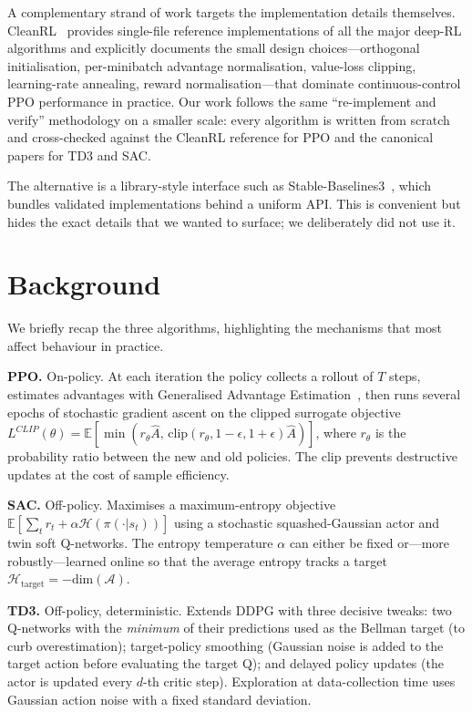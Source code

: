 \documentclass[letterpaper]{article}
\begin{document}
A complementary strand of work targets the implementation details
themselves. CleanRL~\citep{huang2022cleanrl} provides single-file
reference implementations of all the major deep-RL algorithms and
explicitly documents the small design choices---orthogonal
initialisation, per-minibatch advantage normalisation, value-loss
clipping, learning-rate annealing, reward normalisation---that dominate
continuous-control PPO performance in practice. Our work follows the
same ``re-implement and verify'' methodology on a smaller scale:
every algorithm is written from scratch and cross-checked against the
CleanRL reference for PPO and the canonical papers for TD3 and SAC.

The alternative is a library-style interface such as
Stable-Baselines3~\citep{raffin2021sb3}, which bundles validated
implementations behind a uniform API. This is convenient but hides the
exact details that we wanted to surface; we deliberately did not use it.

\section{Background}

We briefly recap the three algorithms, highlighting the mechanisms that
most affect behaviour in practice.

\noindent\textbf{PPO.}
On-policy. At each iteration the policy collects a rollout of $T$ steps,
estimates advantages with Generalised Advantage
Estimation~\citep{schulman2017ppo}, then runs several epochs of stochastic
gradient ascent on the clipped surrogate objective
$L^{CLIP}(\theta) = \mathbb{E}\!\left[\min(r_\theta \hat{A},\,
\mathrm{clip}(r_\theta, 1{-}\epsilon, 1{+}\epsilon)\hat{A})\right]$,
where $r_\theta$ is the probability ratio between the new and old
policies. The clip prevents destructive updates at the cost of sample
efficiency.

\noindent\textbf{SAC.}
Off-policy. Maximises a maximum-entropy objective
$\mathbb{E}\!\left[\sum_t r_t + \alpha \mathcal{H}(\pi(\cdot|s_t))\right]$
using a stochastic squashed-Gaussian actor and twin soft Q-networks. The
entropy temperature $\alpha$ can either be fixed or---more robustly---learned
online so that the average entropy tracks a target
$\mathcal{H}_{\text{target}} = -\mathrm{dim}(\mathcal{A})$.

\noindent\textbf{TD3.}
Off-policy, deterministic.
Extends DDPG with three decisive tweaks: two Q-networks with the
\emph{minimum} of their predictions used as the Bellman target (to curb
overestimation); target-policy smoothing (Gaussian noise is added to the
target action before evaluating the target Q); and delayed policy updates
(the actor is updated every $d$-th critic step). Exploration at data-collection
time uses Gaussian action noise with a fixed standard deviation.
\end{document}
